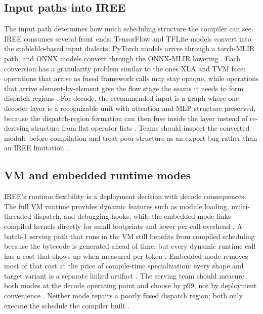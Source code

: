 \subsection{Input paths into IREE}

The input path determines how much scheduling structure the compiler can see. IREE consumes several front ends: TensorFlow and TFLite models convert into the stablehlo-based input dialects, PyTorch models arrive through a torch-MLIR path, and ONNX models convert through the ONNX-MLIR lowering \citep{iree2024,chen2020compilerbasedhardw}. Each conversion has a granularity problem similar to the ones XLA and TVM face: operations that arrive as fused framework calls may stay opaque, while operations that arrive element-by-element give the flow stage the seams it needs to form dispatch regions \citep{patel2025llminference,memoryfloor2026}. For decode, the recommended input is a graph where one decoder layer is a recognizable unit with attention and MLP structure preserved, because the dispatch-region formation can then fuse inside the layer instead of re-deriving structure from flat operator lists \citep{dao2022flashattention,iree2024}. Teams should inspect the converted module before compilation and treat poor structure as an export bug rather than an IREE limitation \citep{chen2020compilerbasedhardw,patel2025llminference}.

\subsection{VM and embedded runtime modes}

IREE's runtime flexibility is a deployment decision with decode consequences. The full VM runtime provides dynamic features such as module loading, multi-threaded dispatch, and debugging hooks, while the embedded mode links compiled kernels directly for small footprints and lower per-call overhead \citep{iree2024}. A batch-1 serving path that runs in the VM still benefits from compiled scheduling because the bytecode is generated ahead of time, but every dynamic runtime call has a cost that shows up when measured per token \citep{taxbreak2026,memoryfloor2026}. Embedded mode removes most of that cost at the price of compile-time specialization: every shape and target variant is a separate linked artifact \citep{iree2024,patel2025llminference}. The serving team should measure both modes at the decode operating point and choose by p99, not by deployment convenience \citep{kwon2023vllm,taxbreak2026}. Neither mode repairs a poorly fused dispatch region; both only execute the schedule the compiler built \citep{dao2022flashattention,memoryfloor2026}.

